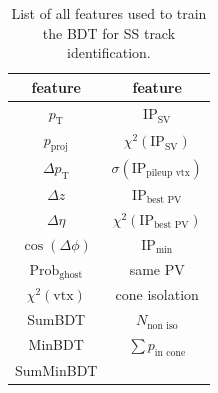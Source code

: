 \begin{table}
    \centering
    \caption{List of all features used to train the BDT for SS track identification.}
    \label{tab:SS_features}
    \begin{tabular}{c c}
        \toprule
        feature & feature \\
        \midrule
        $p_\text{T}$        & $\text{IP}_\text{SV}$ \\ 
        $p_\text{proj}$     & $\chi^2(\text{IP}_\text{SV})$ \\ 
        $\Delta p_\text{T}$ & $\sigma(\text{IP}_\text{pileup vtx})$ \\ 
        $\Delta z$          & $\text{IP}_\text{best PV}$ \\    
        $\Delta \eta$       & $\chi^2(\text{IP}_\text{best PV})$ \\ 
        $\cos(\Delta \phi)$ & $\text{IP}_\text{min}$ \\ 
        $\text{Prob}_\text{ghost}$ & same PV \\
        $\chi^2(\text{vtx})$     & cone isolation \\
        SumBDT              & $N_\text{non iso}$ \\ 
        MinBDT              & $\sum p_\text{in cone}$ \\ 
        SumMinBDT           &  \\
        \bottomrule
    \end{tabular}
\end{table}

